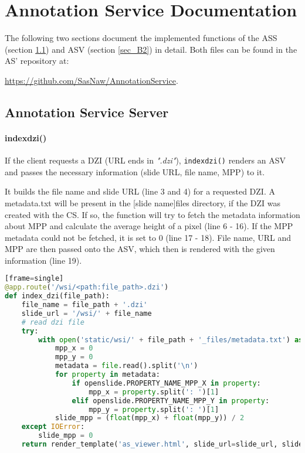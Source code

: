 \chapter{Annotation Service Documentation}

The following two sections document the implemented functions of the ASS (section \ref{sec_B1}) and ASV (section \ref{sec_B2}) in detail. Both files can be found in the AS' repository at:

 \url{https://github.com/SasNaw/AnnotationService}.

\section{Annotation Service Server}
\label{sec_B1}

\subsubsection{index{\textunderscore}dzi()}
If the client requests a DZI (URL ends in \emph{".dzi"}), \texttt{index{\textunderscore}dzi()} renders an ASV and passes the necessary information (slide URL, file name, MPP) to it.

It builds the file name and slide URL (line 3 and 4) for a requested DZI. A metadata.txt will be present in the [slide name]{\textunderscore}files directory, if the DZI was created with the CS. If so, the function will try to fetch the metadata information about MPP and calculate the average height of a pixel (line 6 - 16). If the MPP metadata could not be fetched, it is set to 0 (line 17 - 18). File name, URL and MPP are then passed onto the ASV, which then is rendered with the given information (line 19).

\begin{lstlisting}[language=Python][frame=single]
@app.route('/wsi/<path:file_path>.dzi')
def index_dzi(file_path):
	file_name = file_path + '.dzi'
	slide_url = '/wsi/' + file_name
	# read dzi file
	try:
		with open('static/wsi/' + file_path + '_files/metadata.txt') as file:
			mpp_x = 0
			mpp_y = 0
			metadata = file.read().split('\n')
			for property in metadata:
				if openslide.PROPERTY_NAME_MPP_X in property:
					mpp_x = property.split(': ')[1]
				elif openslide.PROPERTY_NAME_MPP_Y in property:
					mpp_y = property.split(': ')[1]
			slide_mpp = (float(mpp_x) + float(mpp_y)) / 2
	except IOError:
		slide_mpp = 0
	return render_template('as_viewer.html', slide_url=slide_url, slide_mpp=slide_mpp, file_name=file_name)
\end{lstlisting}


